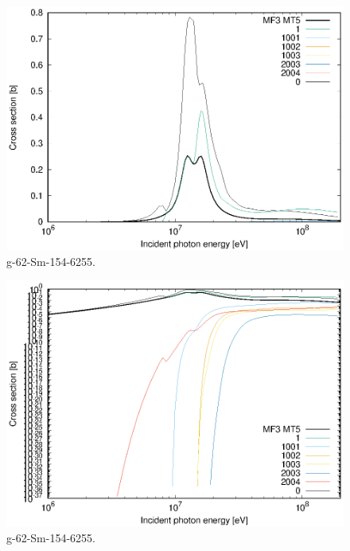\begin{figure}
 \includegraphics[width=\linewidth]{eps/g_62-Sm-154_6255.eps}
  \caption{g-62-Sm-154-6255.}
\end{figure}
\begin{figure}
 \includegraphics[width=\linewidth]{eps-log/g_62-Sm-154_6255.eps}
 \caption{g-62-Sm-154-6255.}
\end{figure}
\newpage \clearpage

